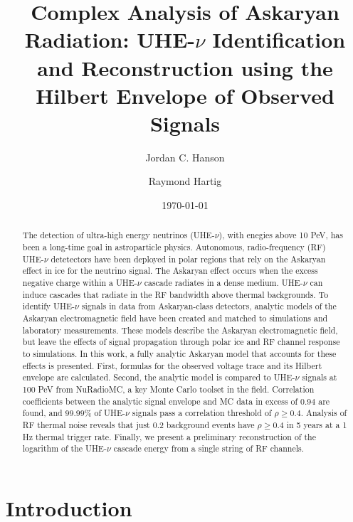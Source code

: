\documentclass[amsmath,amssymb,aps,prd,10pt,twocolumn,showkeys]{revtex4}
\begin{document}
\title{Complex Analysis of Askaryan Radiation: UHE-$\nu$ Identification and Reconstruction using the Hilbert Envelope of Observed Signals}

\author{Jordan C. Hanson}
\author{Raymond Hartig}
\date{\today}

\begin{abstract}
The detection of ultra-high energy neutrinos (UHE-$\nu$), with enegies above 10 PeV, has been a long-time goal in astroparticle physics.  Autonomous, radio-frequency (RF) UHE-$\nu$ detetectors have been deployed in polar regions that rely on the Askaryan effect in ice for the neutrino signal.  The Askaryan effect occurs when the excess negative charge within a UHE-$\nu$ cascade radiates in a dense medium.  UHE-$\nu$ can induce cascades that radiate in the RF bandwidth above thermal backgrounds.  To identify UHE-$\nu$ signals in data from Askaryan-class detectors, analytic models of the Askaryan electromagnetic field have been created and matched to simulations and laboratory measurements.  These models describe the Askaryan electromagnetic field, but leave the effects of signal propagation through polar ice and RF channel response to simulations.  In this work, a fully analytic Askaryan model that accounts for these effects is presented.  First, formulas for the observed voltage trace and its Hilbert envelope are calculated.  Second, the analytic model is compared to UHE-$\nu$ signals at 100 PeV from NuRadioMC, a key Monte Carlo toolset in the field.  Correlation coefficients between the analytic signal envelope and MC data in excess of $0.94$ are found, and 99.99\% of UHE-$\nu$ signals pass a correlation threshold of $\rho\geq 0.4$.  Analysis of RF thermal noise reveals that just 0.2 background events have $\rho\geq 0.4$ in 5 years at a 1 Hz thermal trigger rate.  Finally, we present a preliminary reconstruction of the logarithm of the UHE-$\nu$ cascade energy from a single string of RF channels.
\end{abstract}


\maketitle

\section{Introduction}
\label{sec:int}
\end{document}
